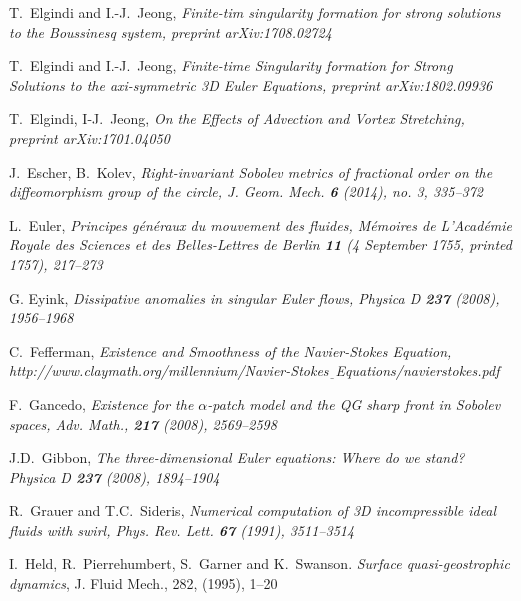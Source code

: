 \documentclass[reqno,centertags, 11pt]{amsart}
\begin{document}
\begin{thebibliography}{99}
 T.~Elgindi and I.-J.~Jeong, \it Finite-tim singularity formation for strong solutions to the Boussinesq system,
\rm preprint arXiv:1708.02724

 T.~Elgindi and I.-J.~Jeong, \it Finite-time Singularity formation for Strong Solutions to the axi-symmetric 3D Euler Equations,
\rm preprint arXiv:1802.09936

 T.~Elgindi, I-J.~Jeong, \it On the Effects of Advection and Vortex Stretching, \rm preprint arXiv:1701.04050

 J.~Escher, B.~Kolev, \it Right-invariant Sobolev metrics of fractional order on the diffeomorphism
group of the circle, \rm  J. Geom. Mech. {\bf 6} (2014), no. 3, 335--372


 L.~Euler, \it
Principes g\'en\'eraux du mouvement des fluides, \rm M\'emoires de L'Acad\'emie Royale des Sciences et des Belles-Lettres de Berlin {\bf 11}
(4 September 1755, printed 1757), 217--273

 G. Eyink, \it Dissipative anomalies in singular Euler flows, \rm Physica D {\bf 237}
(2008), 1956--1968

 C.~Fefferman, \it Existence and Smoothness of the Navier-Stokes Equation, \rm
http://www.claymath.org/millennium/Navier-Stokes$\underline{ \,\,\,}$Equations/navierstokes.pdf

 F.~Gancedo, \it Existence for the $\alpha$-patch model
and the QG sharp front in Sobolev spaces,
\rm Adv. Math., {\bf 217} (2008), 2569--2598

 J.D.~Gibbon, \it The three-dimensional Euler equations: Where do we stand? \rm
Physica D {\bf 237} (2008), 1894--1904

 R.~Grauer and T.C.~Sideris, \it Numerical computation of 3D incompressible ideal fluids with swirl, \rm Phys. Rev. Lett. {\bf 67} (1991), 3511--3514


 I.~Held, R.~Pierrehumbert, S.~Garner and K.~Swanson.
\textit{Surface quasi-geostrophic dynamics}, J. Fluid Mech., 282, (1995), 1--20


\end{thebibliography}
\end{document}

